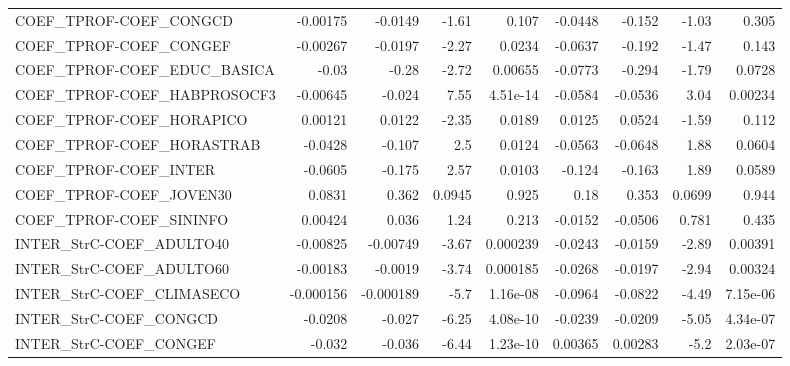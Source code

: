 \begin{tabular}{lrrrrrrrr}
COEF\_TPROF-COEF\_CONGCD               &    -0.00175 &      -0.0149 &   -1.61 &    0.107 &    -0.0448 &      -0.152 &        -1.03 &         0.305 \\
COEF\_TPROF-COEF\_CONGEF               &    -0.00267 &      -0.0197 &   -2.27 &   0.0234 &    -0.0637 &      -0.192 &        -1.47 &         0.143 \\
COEF\_TPROF-COEF\_EDUC\_BASICA          &       -0.03 &        -0.28 &   -2.72 &  0.00655 &    -0.0773 &      -0.294 &        -1.79 &        0.0728 \\
COEF\_TPROF-COEF\_HABPROSOCF3          &    -0.00645 &       -0.024 &    7.55 & 4.51e-14 &    -0.0584 &     -0.0536 &         3.04 &       0.00234 \\
COEF\_TPROF-COEF\_HORAPICO             &     0.00121 &       0.0122 &   -2.35 &   0.0189 &     0.0125 &      0.0524 &        -1.59 &         0.112 \\
COEF\_TPROF-COEF\_HORASTRAB            &     -0.0428 &       -0.107 &     2.5 &   0.0124 &    -0.0563 &     -0.0648 &         1.88 &        0.0604 \\
COEF\_TPROF-COEF\_INTER                &     -0.0605 &       -0.175 &    2.57 &   0.0103 &     -0.124 &      -0.163 &         1.89 &        0.0589 \\
COEF\_TPROF-COEF\_JOVEN30              &      0.0831 &        0.362 &  0.0945 &    0.925 &       0.18 &       0.353 &       0.0699 &         0.944 \\
COEF\_TPROF-COEF\_SININFO              &     0.00424 &        0.036 &    1.24 &    0.213 &    -0.0152 &     -0.0506 &        0.781 &         0.435 \\
INTER\_StrC-COEF\_ADULTO40             &    -0.00825 &     -0.00749 &   -3.67 & 0.000239 &    -0.0243 &     -0.0159 &        -2.89 &       0.00391 \\
INTER\_StrC-COEF\_ADULTO60             &    -0.00183 &      -0.0019 &   -3.74 & 0.000185 &    -0.0268 &     -0.0197 &        -2.94 &       0.00324 \\
INTER\_StrC-COEF\_CLIMASECO            &   -0.000156 &    -0.000189 &    -5.7 & 1.16e-08 &    -0.0964 &     -0.0822 &        -4.49 &      7.15e-06 \\
INTER\_StrC-COEF\_CONGCD               &     -0.0208 &       -0.027 &   -6.25 & 4.08e-10 &    -0.0239 &     -0.0209 &        -5.05 &      4.34e-07 \\
INTER\_StrC-COEF\_CONGEF               &      -0.032 &       -0.036 &   -6.44 & 1.23e-10 &    0.00365 &     0.00283 &         -5.2 &      2.03e-07 \\

\end{tabular}
